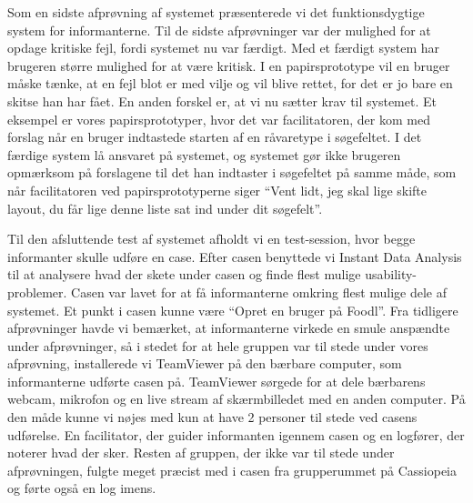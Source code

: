 Som en sidste afprøvning af systemet præsenterede vi det funktionsdygtige system for informanterne. 
Til de sidste afprøvninger var der mulighed for at opdage kritiske fejl, fordi systemet nu var færdigt. Med et færdigt system har brugeren større mulighed for at være kritisk. I en papirsprototype vil en bruger måske tænke, at en fejl blot er med vilje og vil blive rettet, for det er jo bare en skitse han har fået. En anden forskel er, at vi nu sætter krav til systemet. Et eksempel er vores papirsprototyper, hvor det var facilitatoren, der kom med forslag når en bruger indtastede starten af en råvaretype i søgefeltet. I det færdige system lå ansvaret på systemet, og systemet gør ikke brugeren opmærksom på forslagene til det han indtaster i søgefeltet på samme måde, som når facilitatoren ved papirsprototyperne siger ``Vent lidt, jeg skal lige skifte layout, du får lige denne liste sat ind under dit søgefelt''.

Til den afsluttende test af systemet afholdt vi en test-session, hvor begge informanter skulle udføre en case. Efter casen benyttede vi Instant Data Analysis\cite{debida} til at analysere hvad der skete under casen og finde flest mulige usability-problemer. Casen var lavet for at få informanterne omkring flest mulige dele af systemet. Et punkt i casen kunne \fx være ``Opret en bruger på Foodl''. Fra tidligere afprøvninger havde vi bemærket, at informanterne virkede en smule anspændte under afprøvninger, så i stedet for at hele gruppen var til stede under vores afprøvning, installerede vi TeamViewer på den bærbare computer, som informanterne udførte casen på. TeamViewer sørgede for at dele bærbarens webcam, mikrofon og en live stream af skærmbilledet med en anden computer. På den måde kunne vi nøjes med kun at have 2 personer til stede ved casens udførelse. En facilitator, der guider informanten igennem casen og en logfører, der noterer hvad der sker. Resten af gruppen, der ikke var til stede under afprøvningen, fulgte meget præcist med i casen fra grupperummet på Cassiopeia og førte også en log imens.

